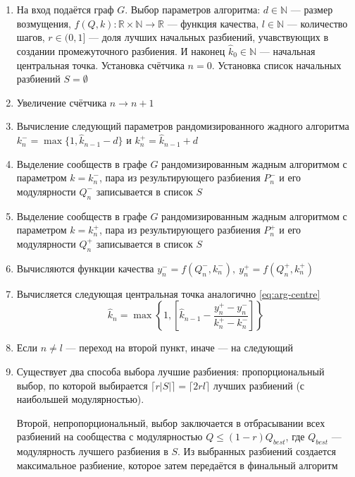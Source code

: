 \begin{enumerate}
	\item На вход подаётся граф $G$. Выбор параметров алгоритма: $d \in \mathbb{N}$ --- размер возмущения, $f(Q, k): \mathbb{R} \times \mathbb{N} \rightarrow \mathbb{R}$ --- функция качества, $l \in \mathbb{N}$ --- количество шагов, $r \in (0, 1]$ --- доля лучших начальных разбиений, учавствующих в создании промежуточного разбиения. И наконец $\hat{k}_0 \in \mathbb{N}$ --- начальная центральная точка. Установка счётчика $n = 0$. Установка список начальных разбиений $S = \emptyset$
	\item Увеличение счётчика $n \rightarrow n + 1$
	\item \label{item:es-k+} Вычисление следующий параметров рандомизированного жадного алгоритма $k_n^{-} = \max\{1, \hat{k}_{n - 1} - d\}$ и $k_n^{+} = \hat{k}_{n - 1} + d$
	\item Выделение сообществ в графе $G$ рандомизированным жадным алгоритмом с параметром $k = k_n^{-}$, пара из результирующего разбиения $P_n^{-}$ и его модулярности $Q_n^{-}$ записывается в список $S$
	\item Выделение сообществ в графе $G$ рандомизированным жадным алгоритмом с параметром $k = k_n^{+}$, пара из результирующего разбиения $P_n^{+}$ и его модулярности $Q_n^{+}$ записывается в список $S$
	\item Вычисляются функции качества $y_n^{-} = f(Q_n^{-}, k_n^{-}),\ y_n^{+} = f(Q_n^{+}, k_n^{+})$
	\item Вычисляется следующая центральная точка аналогично \eqref{eq:arg-centre}
	\begin{equation}\label{eq:aes-centre}
		\hat{k}_n = \max\left\{1, \left[\hat{k}_{n - 1} - \frac{y_n^{+} - y_n^{-}}{k_n^{+} - k_n^{-}}\right]\right\}
	\end{equation}
	\item Если $n \ne l$ --- переход на второй пункт, иначе --- на следующий
	\item Существует два способа выбора лучшие разбиения: пропорциональный выбор, по которой выбирается $\lceil r|S| \rceil = \lceil 2rl \rceil$ лучших разбиений (с наибольшей модулярностью).

	Второй, непропорциональный, выбор заключается в отбрасывании всех разбиений на сообщества с модулярностью $Q \le (1 - r)Q_{best}$, где $Q_{best}$ --- модулярность лучшего разбиения в $S$. Из выбранных разбиений создается максимальное разбиение, которое затем передаётся в финальный алгоритм
\end{enumerate}

